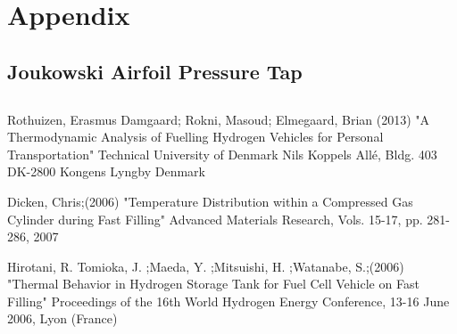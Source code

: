 \documentclass[paper=a4, fontsize=11pt, abstract=on]{scrartcl}
\numberwithin{equation}{section}		%
\numberwithin{figure}{section}			%
\numberwithin{table}{section}				%
\begin{document}
\newpage



\appendix
\section{Appendix} \label{App:Appendix}
\subsection{Joukowski Airfoil Pressure Tap}



\subsection{}




\begin{thebibliography}{99} %
 Rothuizen, Erasmus Damgaard; Rokni, Masoud; Elmegaard, Brian (2013)
\newblock "A Thermodynamic Analysis of Fuelling Hydrogen Vehicles for Personal Transportation" Technical University of Denmark
\newblock Nils Koppels Allé, Bldg. 403 DK-2800 Kongens Lyngby Denmark


 Dicken, Chris;(2006)
\newblock "Temperature Distribution within a Compressed Gas Cylinder during Fast Filling"
\newblock  Advanced Materials Research, Vols. 15-17, pp. 281-286, 2007 


 Hirotani, R.
Tomioka, J. ;Maeda, Y. ;Mitsuishi, H. ;Watanabe, S.;(2006)
\newblock "Thermal Behavior in Hydrogen Storage Tank for Fuel Cell Vehicle on Fast Filling"
\newblock  Proceedings of the 16th World Hydrogen Energy Conference, 13-16 June 2006, Lyon (France)


\end{thebibliography}


\end{document}
